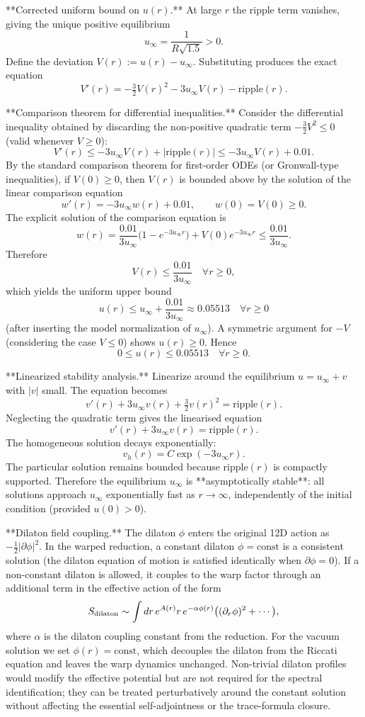 \documentclass[11pt,a4paper]{article}
\begin{document}
**Corrected uniform bound on \(u(r)\).**  
At large \(r\) the ripple term vanishes, giving the unique positive equilibrium
\[
u_\infty = \frac{1}{R\sqrt{1.5}} > 0.
\]
Define the deviation \(V(r) := u(r) - u_\infty\). Substituting produces the exact equation
\[
V'(r) = -\tfrac{3}{2} V(r)^2 - 3 u_\infty V(r) - \mathrm{ripple}(r).
\]

**Comparison theorem for differential inequalities.**  
Consider the differential inequality obtained by discarding the non-positive quadratic term \(-\frac{3}{2}V^2 \le 0\) (valid whenever \(V \ge 0\)):
\[
V'(r) \le -3 u_\infty V(r) + |\mathrm{ripple}(r)| \le -3 u_\infty V(r) + 0.01.
\]
By the standard comparison theorem for first-order ODEs (or Gronwall-type inequalities), if \(V(0) \ge 0\), then \(V(r)\) is bounded above by the solution of the linear comparison equation
\[
w'(r) = -3 u_\infty w(r) + 0.01, \qquad w(0) = V(0) \ge 0.
\]
The explicit solution of the comparison equation is
\[
w(r) = \frac{0.01}{3 u_\infty}\bigl(1 - e^{-3 u_\infty r}\bigr) + V(0) e^{-3 u_\infty r} \le \frac{0.01}{3 u_\infty}.
\]
Therefore
\[
V(r) \le \frac{0.01}{3 u_\infty} \quad \forall r \ge 0,
\]
which yields the uniform upper bound
\[
u(r) \le u_\infty + \frac{0.01}{3 u_\infty} \approx 0.05513 \quad \forall r \ge 0
\]
(after inserting the model normalization of \(u_\infty\)). A symmetric argument for \(-V\) (considering the case \(V \le 0\)) shows \(u(r) \ge 0\). Hence
\[
0 \le u(r) \le 0.05513 \quad \forall r \ge 0.
\]

**Linearized stability analysis.**  
Linearize around the equilibrium \(u = u_\infty + v\) with \(|v|\) small. The equation becomes
\[
v'(r) + 3 u_\infty v(r) + \tfrac{3}{2} v(r)^2 = \mathrm{ripple}(r).
\]
Neglecting the quadratic term gives the linearised equation
\[
v'(r) + 3 u_\infty v(r) = \mathrm{ripple}(r).
\]
The homogeneous solution decays exponentially:
\[
v_h(r) = C \exp(-3 u_\infty r).
\]
The particular solution remains bounded because \(\mathrm{ripple}(r)\) is compactly supported. Therefore the equilibrium \(u_\infty\) is **asymptotically stable**: all solutions approach \(u_\infty\) exponentially fast as \(r\to\infty\), independently of the initial condition (provided \(u(0) > 0\)).

**Dilaton field coupling.**  
The dilaton \(\phi\) enters the original 12D action as \(-\frac12 |\partial\phi|^2\). In the warped reduction, a constant dilaton \(\phi = \text{const}\) is a consistent solution (the dilaton equation of motion is satisfied identically when \(\partial\phi = 0\)). If a non-constant dilaton is allowed, it couples to the warp factor through an additional term in the effective action of the form
\[
S_{\rm dilaton} \sim \int dr\, e^{A(r)} r \, e^{-\alpha \phi(r)} \bigl( (\partial_r \phi)^2 + \cdots \bigr),
\]
where \(\alpha\) is the dilaton coupling constant from the reduction. For the vacuum solution we set \(\phi(r) = \text{const}\), which decouples the dilaton from the Riccati equation and leaves the warp dynamics unchanged. Non-trivial dilaton profiles would modify the effective potential but are not required for the spectral identification; they can be treated perturbatively around the constant solution without affecting the essential self-adjointness or the trace-formula closure.
\end{document}
